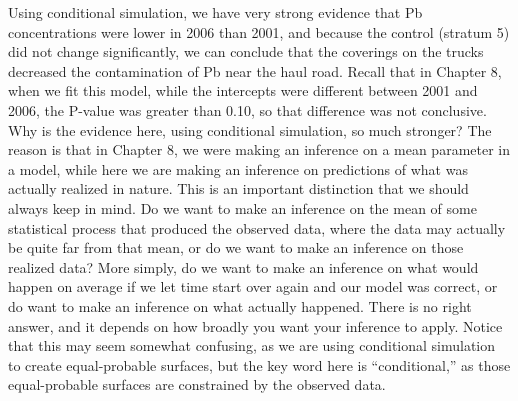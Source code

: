 \documentclass[12pt, titlepage]{article}
\begin{document}
Using conditional simulation, we have very strong evidence that Pb concentrations were lower in 2006 than 2001, and because the control (stratum 5) did not change significantly, we can conclude that the coverings on the trucks decreased the contamination of Pb near the haul road.  Recall that in Chapter 8, when we fit this model, while the intercepts were different between 2001 and 2006, the P-value was greater than 0.10, so that difference was not conclusive.  Why is the evidence here, using conditional simulation, so much stronger?  The reason is that in Chapter 8, we were making an inference on a mean parameter in a model, while here we are making an inference on predictions of what was actually realized in nature.  This is an important distinction that we should always keep in mind.  Do we want to make an inference on the mean of some statistical process that produced the observed data, where the data may actually be quite far from that mean, or do we want to make an inference on those realized data?  More simply, do we want to make an inference on what would happen on average if we let time start over again and our model was correct, or do want to make an inference on what actually happened.  There is no right answer, and it depends on how broadly you want your inference to apply. Notice that this may seem somewhat confusing, as we are using conditional simulation to create equal-probable surfaces, but the key word here is ``conditional,'' as those equal-probable surfaces are constrained by the observed data.
\end{document}
